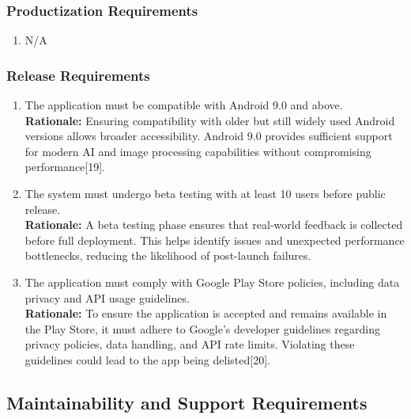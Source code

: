 \documentclass[]{article}
\begin{document}
\subsubsection{Productization Requirements}
\label{ssub:productization_requirements}
\begin{enumerate}[label={OE-P\arabic*.}]
    \item N/A
\end{enumerate}

\subsubsection{Release Requirements}
\label{ssub:release_requirements}
\begin{enumerate}[label={OE-R\arabic*.}]
    \item The application must be compatible with Android 9.0 and above.\\
	\textbf{Rationale:} Ensuring compatibility with older but still widely used Android versions allows broader accessibility. Android 9.0 provides sufficient support for modern AI and image processing capabilities without compromising performance[19].
	\item The system must undergo beta testing with at least 10 users before public release.\\	
	\textbf{Rationale:} A beta testing phase ensures that real-world feedback is collected before full deployment. This helps identify issues and unexpected performance bottlenecks, reducing the likelihood of post-launch failures.
	\item The application must comply with Google Play Store policies, including data privacy and API usage guidelines.\\	
	\textbf{Rationale:} To ensure the application is accepted and remains available in the Play Store, it must adhere to Google’s developer guidelines regarding privacy policies, data handling, and API rate limits. Violating these guidelines could lead to the app being delisted[20].
\end{enumerate}


\subsection{Maintainability and Support Requirements}
\label{sub:maintainability_and_support_requirements}
\end{document}
